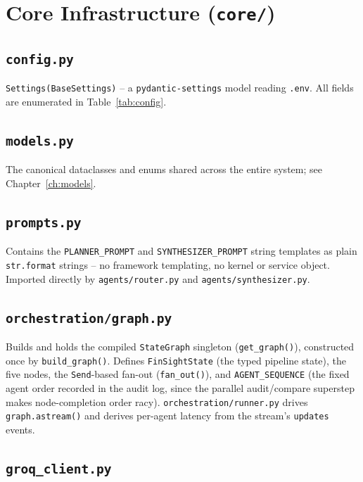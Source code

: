 \documentclass[11pt,a4paper]{report}
\newcommand{\code}[1]{\texttt{#1}}
\newcommand{\file}[1]{\texttt{\small #1}}
\begin{document}
\section{Core Infrastructure (\file{core/})}

\subsection{\file{config.py}}

\code{Settings(BaseSettings)} -- a \code{pydantic-settings} model reading \file{.env}.
All fields are enumerated in Table~\ref{tab:config}.

\subsection{\file{models.py}}

The canonical dataclasses and enums shared across the entire system; see
Chapter~\ref{ch:models}.

\subsection{\file{prompts.py}}

Contains the \code{PLANNER\_PROMPT} and \code{SYNTHESIZER\_PROMPT} string templates
as plain \code{str.format} strings -- no framework templating, no kernel or service
object. Imported directly by \file{agents/router.py} and \file{agents/synthesizer.py}.

\subsection{\file{orchestration/graph.py}}

Builds and holds the compiled \code{StateGraph} singleton (\code{get\_graph()}),
constructed once by \code{build\_graph()}. Defines \code{FinSightState} (the typed
pipeline state), the five nodes, the \code{Send}-based fan-out (\code{fan\_out()}),
and \code{AGENT\_SEQUENCE} (the fixed agent order recorded in the audit log, since the
parallel audit/compare superstep makes node-completion order racy).
\file{orchestration/runner.py} drives \code{graph.astream()} and derives per-agent
latency from the stream's \code{updates} events.

\subsection{\file{groq\_client.py}}
\end{document}
